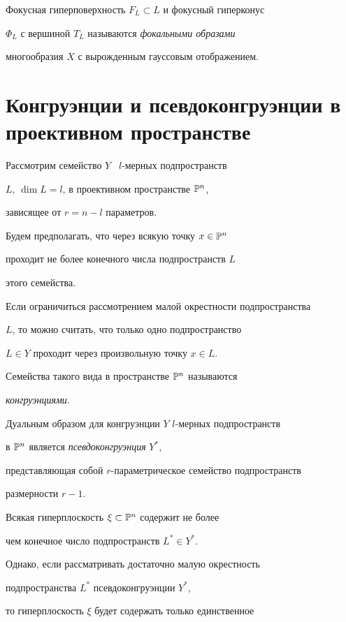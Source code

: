 Фокусная гиперповерхность $F_L \subset L$ и фокусный гиперконус


$\Phi_L$ с вершиной $T_L$ называются {\em фокальными образами}


многообразия $X$ с вырожденным гауссовым отображением.






\section{Конгруэнции и псевдоконгруэнции в проективном пространстве}



Рассмотрим семейство $Y$ \ $l$-мерных подпространств


$L$, $\dim L = l$, в проективном пространстве $\Bbb{P}^n$,


зависящее от $r = n - l$ параметров.


 Будем предполагать, что через всякую точку $x \in \Bbb{P}^n$


проходит не более конечного числа подпространств $L$


этого семейства.


 Если ограничиться рассмотрением малой окрестности подпространства


$L$, то можно считать, что только одно подпространство


$L \in Y$ проходит через произвольную точку $x \in L$.


 Семейства такого вида в пространстве $\Bbb{P}^n$ называются


{\it конгруэнциями}.





Дуальным образом для конгруэнции $Y$ $l$-мерных подпространств


в $\Bbb{P}^n$ является {\it псевдоконгруэнция} $Y^*$,


представляющая собой $r$-параметрическое семейство подпространств


размерности $r - 1$.


 Всякая гиперплоскость $\xi \subset \Bbb{P}^n$ содержит не более


чем конечное число подпространств $L^* \in Y^*$.


 Однако, если рассматривать достаточно малую окрестность


подпространства $L^*$ псевдоконгруэнции $Y^*$,


то гиперплоскость $\xi$ будет содержать только единственное


